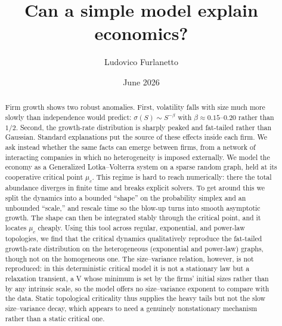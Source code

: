\documentclass[12pt]{article}
\title{Can a simple model explain economics?}
\author{Ludovico Furlanetto}
\date{June 2026}
\begin{document}
\maketitle

\begin{abstract}
Firm growth shows two robust anomalies. First, volatility falls with size much more
slowly than independence would predict: $\sigma(S)\sim S^{-\beta}$ with
$\beta\approx0.15$--$0.20$ rather than $1/2$. Second, the
growth-rate distribution is sharply peaked and fat-tailed rather than Gaussian.
Standard explanations put the source of these effects inside each firm. We ask
instead whether the same facts can emerge between firms, from a network of
interacting companies in which no heterogeneity is imposed externally. We model the
economy as a Generalized Lotka--Volterra system on a sparse random graph, held at its
cooperative critical point $\mu_c$. This regime is hard to reach numerically: there
the total abundance diverges in finite time and breaks explicit solvers. To get
around this we split the dynamics into a bounded ``shape'' on the probability simplex
and an unbounded ``scale,'' and rescale time so the blow-up turns into smooth
asymptotic growth. The shape can then be integrated stably through the critical
point, and it locates $\mu_c$ cheaply. Using this tool across regular, exponential,
and power-law topologies, we find that the critical dynamics qualitatively reproduce the fat-tailed
growth-rate distribution on the heterogeneous (exponential and power-law) graphs,
though not on the homogeneous one. The size--variance relation, however, is not
reproduced: in this deterministic critical model it is not a stationary law but a
relaxation transient, a V whose minimum is set by the firms' initial sizes rather than
by any intrinsic scale, so the model offers no size--variance exponent to compare with
the data. Static topological criticality thus supplies the heavy tails but not the
slow size--variance decay, which appears to need a genuinely nonstationary mechanism
rather than a static critical one.
\end{abstract}
\end{document}
